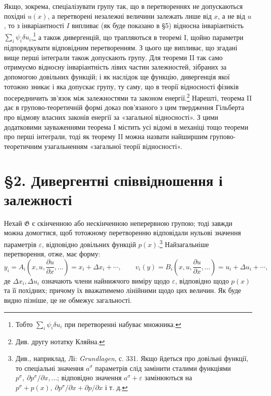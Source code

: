 \documentclass[11pt]{article}
\providecommand{\G}{\mathfrak G}
\providecommand{\eps}{\varepsilon}
\providecommand{\D}{\Delta}
\providecommand{\p}{\partial}
\begin{document}
Якщо, зокрема, спеціалізувати групу так, що в перетвореннях не допускаються похідні \(u(x)\), а перетворені незалежні величини залежать лише від \(x\), а не від \(u\), то з інваріантності \(I\) випливає (як буде показано в \S{}5) відносна інваріантність \(\sum_i\psi_i\delta u_i\),\footnote{Тобто \(\sum_i\psi_i\delta u_i\) при перетворенні набуває множника.} а також дивергенцій, що трапляються в теоремі I, щойно параметри підпорядкувати відповідним перетворенням. З цього ще випливає, що згадані вище перші інтеграли також допускають групу. Для теореми II так само отримуємо відносну інваріантність лівих частин залежностей, зібраних за допомогою довільних функцій; і як наслідок ще функцію, дивергенція якої тотожно зникає і яка допускає групу, ту саму, що в теорії відносності фізиків посередничить зв'язок між залежностями та законом енергії.\footnote{Див. другу нотатку Кляйна.} Нарешті, теорема II дає в групово-теоретичній формі доказ пов'язаного з цим твердження Гільберта про відмову власних законів енергії за «загальної відносності». З цими додатковими зауваженнями теорема I містить усі відомі в механіці тощо теореми про перші інтеграли, тоді як теорему II можна назвати найширшим групово-теоретичним узагальненням «загальної теорії відносності».

\section*{\S{}2. Дивергентні співвідношення і залежності}

Нехай \(\G\) є скінченною або нескінченною неперервною групою; тоді завжди можна домогтися, щоб тотожному перетворенню відповідали нульові значення параметрів \(\eps\), відповідно довільних функцій \(p(x)\).\footnote{Див., наприклад, Лі: \emph{Grundlagen}, с. 331. Якщо йдеться про довільні функції, то спеціальні значення \(a^\sigma\) параметрів слід замінити сталими функціями \(p^\sigma,\ \p p^\sigma/\p x,\ldots\); відповідно значення \(a^\sigma+\eps\) замінюються на \(p^\sigma+p(x),\ \p p^\sigma/\p x+\p p/\p x\) і т. д.} Найзагальніше перетворення, отже, має форму:
\[
y_i=A_i\!\left(x,u,\frac{\p u}{\p x},\ldots\right)=x_i+\D x_i+\cdots,\qquad
v_i(y)=B_i\!\left(x,u,\frac{\p u}{\p x},\ldots\right)=u_i+\D u_i+\cdots,
\]
де \(\D x_i,\D u_i\) означають члени найнижчого виміру щодо \(\eps\), відповідно щодо \(p(x)\) та її похідних; причому їх вважатимемо лінійними щодо цих величин. Як буде видно пізніше, це не обмежує загальності.
\end{document}
